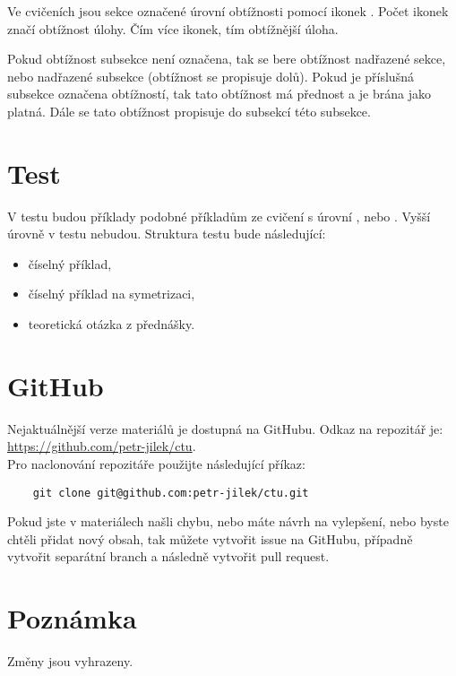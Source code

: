 \documentclass{article}
\begin{document}
Ve cvičeních jsou sekce označené úrovní obtížnosti pomocí ikonek \spicy. Počet ikonek značí obtížnost úlohy. Čím více ikonek, tím obtížnější úloha.

Pokud obtížnost subsekce není označena, tak se bere obtížnost nadřazené sekce, nebo nadřazené subsekce (obtížnost se propisuje dolů). Pokud je příslušná subsekce označena obtížností, tak tato obtížnost má přednost a je brána jako platná. Dále se tato obtížnost propisuje do subsekcí této subsekce.



\section{Test}
V testu budou příklady podobné příkladům ze cvičení s úrovní \spicy, nebo \spicy \spicy. Vyšší úrovně v testu nebudou. Struktura testu bude následující:
\begin{itemize}
    \item číselný příklad,
    \item číselný příklad na symetrizaci,
    \item teoretická otázka z přednášky.
\end{itemize}



\section{GitHub}
Nejaktuálnější verze materiálů je dostupná na GitHubu. Odkaz na repozitář je: \href{https://github.com/petr-jilek/ctu}{https://github.com/petr-jilek/ctu}.\\

Pro naclonování repozitáře použijte následující příkaz:

\begin{verbatim}
    git clone git@github.com:petr-jilek/ctu.git
\end{verbatim}

Pokud jste v materiálech našli chybu, nebo máte návrh na vylepšení, nebo byste chtěli přidat nový obsah, tak můžete vytvořit issue na GitHubu, případně vytvořit separátní branch a následně vytvořit pull request.



\section{Poznámka}
Změny jsou vyhrazeny.
\end{document}
